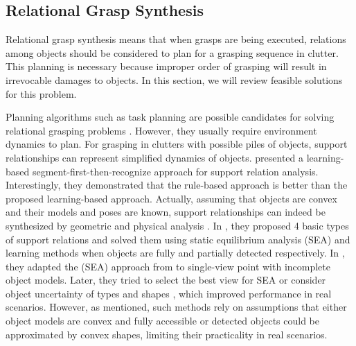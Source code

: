 \documentclass[letterpaper,10pt]{article}
\begin{document}
\subsection{Relational Grasp Synthesis}

Relational grasp synthesis means that when grasps are being executed, relations among objects should be considered to plan for a grasping sequence in clutter.
This planning is necessary because improper order of grasping will result in irrevocable damages to objects.
In this section, we will review feasible solutions for this problem.

%
%

Planning algorithms such as task planning are possible candidates for solving relational grasping problems \cite{garrett2021integrated}.
However, they usually require environment dynamics to plan.
For grasping in clutters with possible piles of objects, support relationships can represent simplified dynamics of objects.
\cite{panda2013learning} presented a learning-based segment-first-then-recognize approach for support relation analysis.
Interestingly, they demonstrated that the rule-based approach is better than the proposed learning-based approach.
Actually, assuming that objects are convex and their models and poses are known, support relationships can indeed be synthesized by geometric and physical analysis \cite{mojtahedzadeh2015support, kartmann2018extraction}.
In \cite{mojtahedzadeh2015support}, they proposed 4 basic types of support relations and solved them using static equilibrium analysis (SEA) and learning methods when objects are fully and partially detected respectively.
In \cite{kartmann2018extraction}, they adapted the (SEA) approach from \cite{mojtahedzadeh2015support} to single-view point with incomplete object models.
Later, they tried to select the best view for SEA \cite{grotz2019active} or consider object uncertainty of types and shapes \cite{paus2021probabilistic}, which improved performance in real scenarios.
However, as mentioned, such methods rely on assumptions that either object models are convex and fully accessible or detected objects could be approximated by convex shapes, limiting their practicality in real scenarios.
\end{document}
